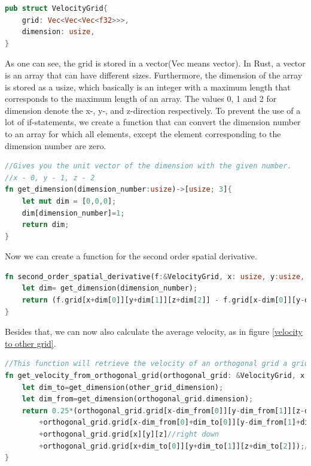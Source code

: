 \documentclass{article}
\begin{document}
\begin{lstlisting}[language=Rust, style=boxed, breaklines=true]
pub struct VelocityGrid{
    grid: Vec<Vec<Vec<f32>>>,
    dimension: usize,
}
\end{lstlisting}
As one can see, the grid is stored in a vector(Vec means vector). In Rust, a vector is an array that can have different sizes. Furthermore, the dimension of the array is stored as a usize, which basically is an integer with a maximum length that corresponds to the maximum length of an array. The values 0, 1 and 2 for dimension denote the x-, y-, and z-direction respectively. To prevent the use of a lot of if-statements, we create a function that can convert the dimension number to an array for which all elements, except the element corresponding to the dimension number are zero. 
\begin{lstlisting}[language=Rust, style=boxed, breaklines=true]
//Gives you the unit vector of the dimension with the given number.
//x - 0, y - 1, z - 2
fn get_dimension(dimension_number:usize)->[usize; 3]{
    let mut dim = [0,0,0];
    dim[dimension_number]=1;
    return dim;
}
\end{lstlisting}
Now we can create a function for the second order spatial derivative.
\begin{lstlisting}[language=Rust, style=boxed, breaklines=true]
fn second_order_spatial_derivative(f:&VelocityGrid, x: usize, y:usize, z:usize, dimension_number:usize) -> f32{
    let dim= get_dimension(dimension_number);
    return (f.grid[x+dim[0]][y+dim[1]][z+dim[2]] - f.grid[x-dim[0]][y-dim[1]][z-dim[2]])/(2.0*GRIDELEMENTSCALE);
}
\end{lstlisting}
Besides that, we can now also calculate the average velocity, as in figure \ref{velocity to other grid}.
\begin{lstlisting}[language=Rust, style=boxed, breaklines=true]
//This function will retrieve the velocity of an orthogonal grid a grid point of another grid.
fn get_velocity_from_orthogonal_grid(orthogonal_grid: &VelocityGrid, x:usize, y:usize, z:usize, other_grid_dimension:usize) -> f32{
    let dim_to=get_dimension(other_grid_dimension);
    let dim_from=get_dimension(orthogonal_grid.dimension);
    return 0.25*(orthogonal_grid.grid[x-dim_from[0]][y-dim_from[1]][z-dim_from[2]]//Left down
        +orthogonal_grid.grid[x-dim_from[0]+dim_to[0]][y-dim_from[1]+dim_to[1]][z-dim_from[2]+dim_to[2]]//left up
        +orthogonal_grid.grid[x][y][z]//right down
        +orthogonal_grid.grid[x+dim_to[0]][y+dim_to[1]][z+dim_to[2]]);//right up
}
\end{lstlisting}
\end{document}
